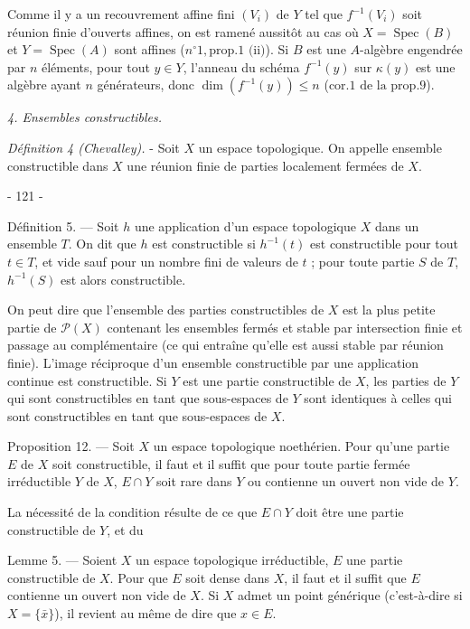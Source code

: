 Comme il y a un recouvrement affine fini $(V_i)$ de $Y$ tel que $f^{-1}(V_i)$ soit réunion finie d'ouverts affines, on est ramené aussitôt au cas où $X=\operatorname{Spec}(B)$ et $Y=\operatorname{Spec}(A)$ sont affines ($n^\circ 1, \text{prop.} 1 \text{ (ii)}$). Si $B$ est une $A$-algèbre engendrée par $n$ éléments, pour tout $y \in Y$, l'anneau du schéma $f^{-1}(y)$ sur $\kappa(y)$ est une algèbre ayant $n$ générateurs, donc $\dim(f^{-1}(y)) \leq n$ ($\text{cor.} 1 \text{ de la prop.} 9$).

\emph{4. Ensembles constructibles.}

\emph{Définition 4 (Chevalley).} - Soit $X$ un espace topologique. On appelle ensemble constructible dans $X$ une réunion finie de parties localement fermées de $X$.

\newpage


- 121 -

Définition 5. — Soit $h$ une application d'un espace topologique $X$ dans un ensemble $T$. On dit que $h$ est constructible si $h^{-1}(t)$ est constructible pour tout $t \in T$, et vide sauf pour un nombre fini de valeurs de $t$ ; pour toute partie $S$ de $T$, $h^{-1}(S)$ est alors constructible.

On peut dire que l'ensemble des parties constructibles de $X$ est la plus petite partie de $\mathcal{P}(X)$ contenant les ensembles fermés et stable par intersection finie et passage au complémentaire (ce qui entraîne qu'elle est aussi stable par réunion finie). L'image réciproque d'un ensemble constructible par une application continue est constructible. Si $Y$ est une partie constructible de $X$, les parties de $Y$ qui sont constructibles en tant que sous-espaces de $Y$ sont identiques à celles qui sont constructibles en tant que sous-espaces de $X$.

Proposition 12. — Soit $X$ un espace topologique noethérien. Pour qu'une partie $E$ de $X$ soit constructible, il faut et il suffit que pour toute partie fermée irréductible $Y$ de $X$, $E \cap Y$ soit rare dans $Y$ ou contienne un ouvert non vide de $Y$.

La nécessité de la condition résulte de ce que $E \cap Y$ doit être une partie constructible de $Y$, et du

Lemme 5. — Soient $X$ un espace topologique irréductible, $E$ une partie constructible de $X$. Pour que $E$ soit dense dans $X$, il faut et il suffit que $E$ contienne un ouvert non vide de $X$. Si $X$ admet un point générique (c'est-à-dire si $X = \{\bar{x}\}$), il revient au même de dire que $x \in E$.

